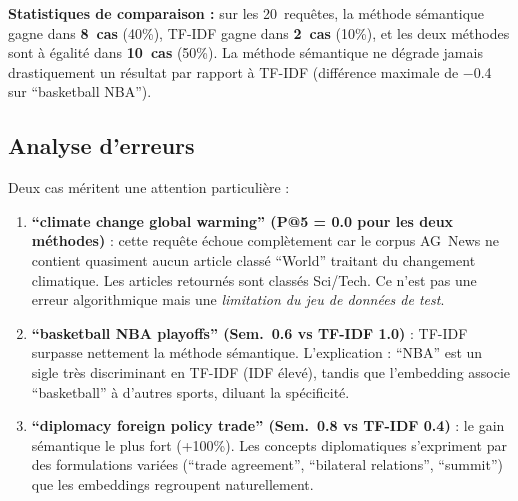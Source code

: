\documentclass[12pt,a4paper]{article}
\begin{document}
\textbf{Statistiques de comparaison :} sur les 20~requ\^{e}tes, la m\'{e}thode s\'{e}mantique gagne dans \textbf{8~cas} (40\%), TF-IDF gagne dans \textbf{2~cas} (10\%), et les deux m\'{e}thodes sont \`{a} \'{e}galit\'{e} dans \textbf{10~cas} (50\%). La m\'{e}thode s\'{e}mantique ne d\'{e}grade jamais drastiquement un r\'{e}sultat par rapport \`{a} TF-IDF (diff\'{e}rence maximale de $-$0.4 sur ``basketball NBA'').

\subsection{Analyse d'erreurs}

Deux cas m\'{e}ritent une attention particuli\`{e}re :

\begin{enumerate}
    \item \textbf{``climate change global warming'' (P@5 = 0.0 pour les deux m\'{e}thodes)} : cette requ\^{e}te \'{e}choue compl\`{e}tement car le corpus AG~News ne contient quasiment aucun article class\'{e} ``World'' traitant du changement climatique. Les articles retourn\'{e}s sont class\'{e}s Sci/Tech. Ce n'est pas une erreur algorithmique mais une \textit{limitation du jeu de donn\'{e}es de test}.

    \item \textbf{``basketball NBA playoffs'' (Sem.\ 0.6 vs TF-IDF 1.0)} : TF-IDF surpasse nettement la m\'{e}thode s\'{e}mantique. L'explication : ``NBA'' est un sigle tr\`{e}s discriminant en TF-IDF (IDF \'{e}lev\'{e}), tandis que l'embedding associe ``basketball'' \`{a} d'autres sports, diluant la sp\'{e}cificit\'{e}.

    \item \textbf{``diplomacy foreign policy trade'' (Sem.\ 0.8 vs TF-IDF 0.4)} : le gain s\'{e}mantique le plus fort (+100\%). Les concepts diplomatiques s'expriment par des formulations vari\'{e}es (``trade agreement'', ``bilateral relations'', ``summit'') que les embeddings regroupent naturellement.
\end{enumerate}
\end{document}
